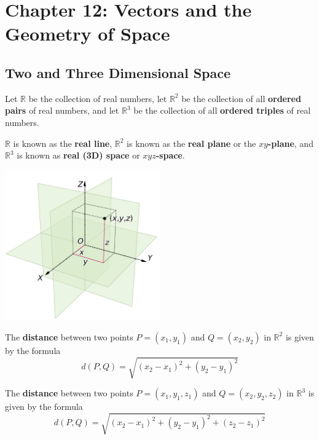\documentclass[letterpaper, twoside, 12pt]{book}
\begin{document}
\setcounter{chapter}{0}

\chapter{Chapter 12: Vectors and the Geometry of Space}

\setcounter{chapter}{12}

\section{Two and Three Dimensional Space}

\begin{definition}
  Let $\mathbb{R}$ be the collection of real numbers, let $\mathbb{R}^2$ be the
  collection of all \textbf{ordered pairs} of real numbers, and let $\mathbb{R}^3$
  be the collection of all \textbf{ordered triples} of real numbers.

  $\mathbb{R}$ is known as the \textbf{real line}, $\mathbb{R}^2$ is known
  as the \textbf{real plane} or the \textbf{$xy$-plane}, and $\mathbb{R}^3$
  is known as \textbf{real (3D) space} or \textbf{$xyz$-space}.
\end{definition}

\begin{center}
  \includegraphics[width=0.5\textwidth]{assets/3dCoordinateSystem.pdf}
\end{center}

\begin{definition}
  The \textbf{distance} between two points $P=(x_1,y_1)$ and
  $Q=(x_2,y_2)$ in $\mathbb{R}^2$ is given by the formula
  \[
    d(P,Q) = \sqrt{(x_2-x_1)^2+(y_2-y_1)^2}
  \]

  The \textbf{distance} between two points $P=(x_1,y_1,z_1)$ and
  $Q=(x_2,y_2,z_2)$ in $\mathbb{R}^3$ is given by the formula
  \[
    d(P,Q) = \sqrt{(x_2-x_1)^2+(y_2-y_1)^2+(z_2-z_1)^2}
  \]
\end{definition}
\end{document}
